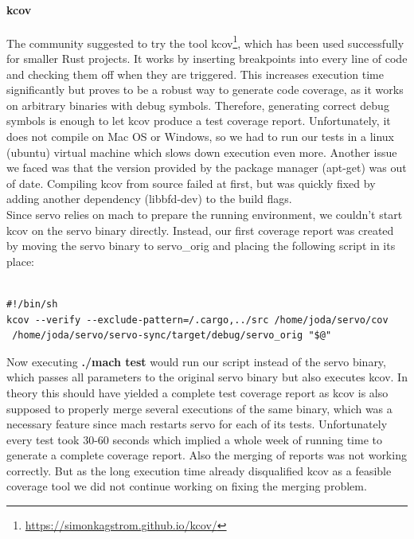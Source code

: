 \documentclass{scrartcl}
\begin{document}
\paragraph{kcov}
The community suggested to try the tool kcov\footnote{\url{https://simonkagstrom.github.io/kcov/}}, which has been used successfully for smaller Rust projects. It works by inserting breakpoints into every line of code and checking them off when they are triggered. This increases execution time significantly but proves to be a robust way to generate code coverage, as it works on arbitrary binaries with debug symbols. Therefore, generating correct debug symbols is enough to let kcov produce a test coverage report. Unfortunately, it does not compile on Mac OS or Windows, so we had to run our tests in a linux (ubuntu) virtual machine which slows down execution even more. Another issue we faced was that the version provided by the package manager (apt-get) was out of date. Compiling kcov from source failed at first, but was quickly fixed by adding another dependency (libbfd-dev) to the build flags.\\

Since servo relies on mach to prepare the running environment, we couldn't start kcov on the servo binary directly. Instead, our first coverage report was created by moving the servo binary to servo\_orig and placing the following script in its place:

\begin{verbatim}

#!/bin/sh
kcov --verify --exclude-pattern=/.cargo,../src /home/joda/servo/cov 
 /home/joda/servo/servo-sync/target/debug/servo_orig "$@"

\end{verbatim}

Now executing \textbf{./mach test} would run our script instead of the servo binary, which passes all parameters to the original servo binary but also executes kcov. In theory this should have yielded a complete test coverage report as kcov is also supposed to properly merge several executions of the same binary, which was a necessary feature since mach restarts servo for each of its tests. Unfortunately every test took 30-60 seconds which implied a whole week of running time to generate a complete coverage report. Also the merging of reports was not working correctly. But as the long execution time already disqualified kcov as a feasible coverage tool we did not continue working on fixing the merging problem.\\
\end{document}
